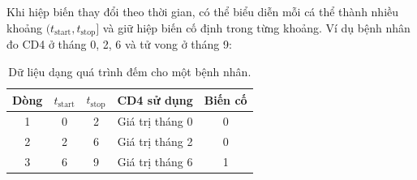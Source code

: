 \documentclass[11pt,a4paper,notitlepage]{report}
\begin{document}
Khi hiệp biến thay đổi theo thời gian, có thể biểu diễn mỗi cá thể thành nhiều khoảng $(t_{\mathrm{start}},t_{\mathrm{stop}}]$
và giữ hiệp biến cố định trong từng khoảng. Ví dụ bệnh nhân đo CD4 ở tháng 0, 2, 6 và tử vong
ở tháng 9:

\begin{table}[ht]\centering
\caption{Dữ liệu dạng quá trình đếm cho một bệnh nhân.}
\begin{tabular}{ccccc}
\toprule
Dòng & $t_{\mathrm{start}}$ & $t_{\mathrm{stop}}$ & CD4 sử dụng & Biến cố\\
\midrule
1 & 0 & 2 & Giá trị tháng 0 & 0\\
2 & 2 & 6 & Giá trị tháng 2 & 0\\
3 & 6 & 9 & Giá trị tháng 6 & 1\\
\bottomrule
\end{tabular}
\end{table}
\end{document}

